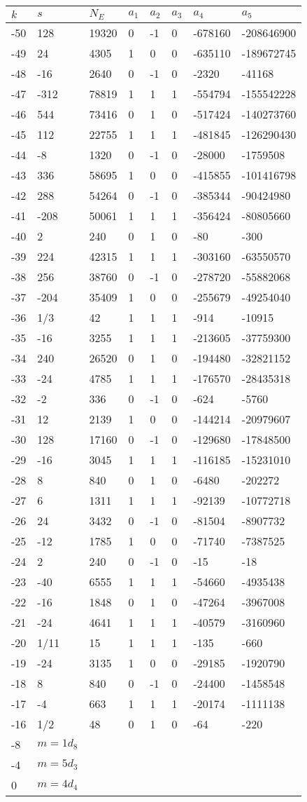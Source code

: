 \documentclass{amsart}
\begin{document}
\begin{longtable}{|l|l|l|lllll|}
\hline
$k$ & $s$ & $N_E$ & $a_1$ & $a_2$ & $a_3$ & $a_4$ & $a_5$\\
\hline
-50&128&19320&0&-1&0&-678160&-208646900\\
-49&24&4305&1&0&0&-635110&-189672745\\
-48&-16&2640&0&-1&0&-2320&-41168\\
-47&-312&78819&1&1&1&-554794&-155542228\\
-46&544&73416&0&1&0&-517424&-140273760\\
-45&112&22755&1&1&1&-481845&-126290430\\
-44&-8&1320&0&-1&0&-28000&-1759508\\
-43&336&58695&1&0&0&-415855&-101416798\\
-42&288&54264&0&-1&0&-385344&-90424980\\
-41&-208&50061&1&1&1&-356424&-80805660\\
-40&2&240&0&1&0&-80&-300\\
-39&224&42315&1&1&1&-303160&-63550570\\
-38&256&38760&0&-1&0&-278720&-55882068\\
-37&-204&35409&1&0&0&-255679&-49254040\\
-36&1/3&42&1&1&1&-914&-10915\\
-35&-16&3255&1&1&1&-213605&-37759300\\
-34&240&26520&0&1&0&-194480&-32821152\\
-33&-24&4785&1&1&1&-176570&-28435318\\
-32&-2&336&0&-1&0&-624&-5760\\
-31&12&2139&1&0&0&-144214&-20979607\\
-30&128&17160&0&-1&0&-129680&-17848500\\
-29&-16&3045&1&1&1&-116185&-15231010\\
-28&8&840&0&1&0&-6480&-202272\\
-27&6&1311&1&1&1&-92139&-10772718\\
-26&24&3432&0&-1&0&-81504&-8907732\\
-25&-12&1785&1&0&0&-71740&-7387525\\
-24&2&240&0&-1&0&-15&-18\\
-23&-40&6555&1&1&1&-54660&-4935438\\
-22&-16&1848&0&1&0&-47264&-3967008\\
-21&-24&4641&1&1&1&-40579&-3160960\\
-20&1/11&15&1&1&1&-135&-660\\
-19&-24&3135&1&0&0&-29185&-1920790\\
-18&8&840&0&-1&0&-24400&-1458548\\
-17&-4&663&1&1&1&-20174&-1111138\\
-16&1/2&48&0&1&0&-64&-220\\
-8&$m=1d_{8}$&&\multicolumn{5}{c|}{}\\
-4&$m=5d_{3}$&&\multicolumn{5}{c|}{}\\
0&$m=4d_{4}$&&\multicolumn{5}{c|}{}\\
\hline
\end{longtable}
\end{document}
